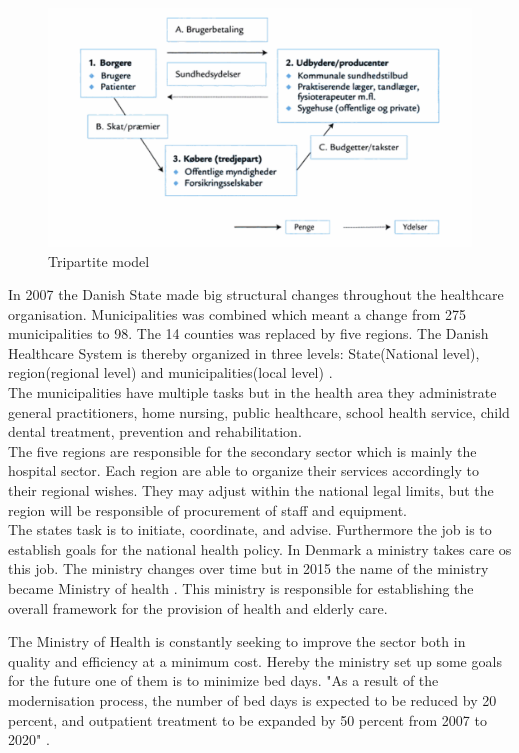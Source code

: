 \begin{figure}[H]
\centering
\includegraphics[width=1\textwidth]{Figure/tredjepart.png}
\caption{Tripartite model \cite{sundhedsvaesen}}
\label{Trepartmodel}
\end{figure} 

In 2007 the Danish State made big structural changes throughout the healthcare organisation. Municipalities was combined which meant a change from 275 municipalities to 98. The 14 counties was replaced by five regions. The Danish Healthcare System is thereby organized in three levels: State(National level), region(regional level) and municipalities(local level) \cite{indenrigs, Healthcareindk2}.\\
The municipalities have multiple tasks but in the health area they administrate general practitioners, home nursing, public healthcare, school health service, child dental treatment, prevention and rehabilitation\cite{sundhedsministeriet}. \\
The five regions are responsible for the secondary sector which is mainly the hospital sector. Each region are able to organize their services accordingly to their regional wishes. They may adjust within the national legal limits, but the region will be responsible of procurement of staff and equipment.\\
The states task is to initiate, coordinate, and advise. Furthermore the job is to establish goals for the national health policy\cite{sundhedsministeriet}. In Denmark a ministry takes care os this job. The ministry changes over time but in 2015 the name of the ministry became Ministry of health \cite{ministryofhealth}. This ministry is responsible for establishing the overall framework for the provision of health and elderly care.

The Ministry of Health is constantly seeking to improve the sector both in quality and efficiency at a minimum cost. Hereby the ministry set up some goals for the future one of them is to minimize bed days. "As a result of the modernisation process, the number of bed days is expected to be reduced by 20 percent, and outpatient treatment to be expanded by 50 percent from 2007 to 2020" \cite{Healthcareindk2}. %


